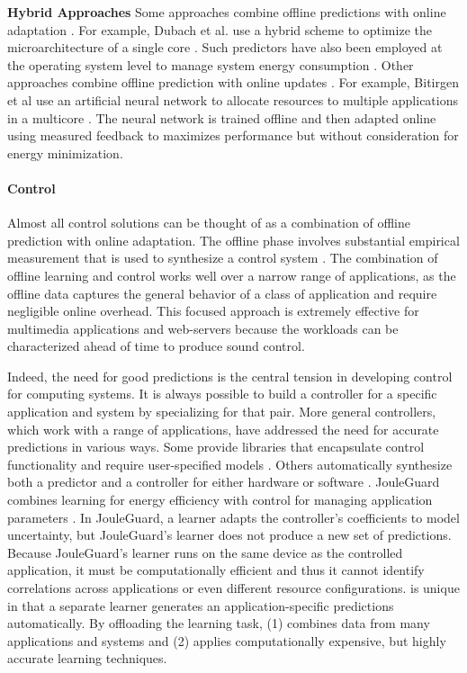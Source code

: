 \noindent \textbf{Hybrid Approaches} Some approaches combine offline
predictions with online adaptation
\cite{Zhang2012,packandcap,Winter2010,dubach2010,Koala,Cinder,
  wu2012inferred}.  For example, Dubach et al.  use a hybrid scheme to
optimize the microarchitecture of a single core \cite{dubach2010}.
Such predictors have also been employed at the operating system level
to manage system energy consumption
\cite{Koala,Cinder,wu2012inferred}.  Other approaches combine offline
prediction with online updates \cite{JouleGuard,Bitirgen2008,Ipek}.
For example, Bitirgen et al use an artificial neural network to
allocate resources to multiple applications in a multicore
\cite{Bitirgen2008}.  The neural network is trained offline and then
adapted online using measured feedback to maximizes performance but
without consideration for energy minimization.

\paragraph{Control}

Almost all control solutions can be thought of as a combination of
offline prediction with online adaptation.  The offline phase involves
substantial empirical measurement that is used to synthesize a control
system
\cite{Wu2004,Chen2011,POET,ControlWare,Agilos,Rajkumar,Sojka,Raghavendra2008}.
The combination of offline learning and control works well over a
narrow range of applications, as the offline data captures the general
behavior of a class of application and require negligible online
overhead.  This focused approach is extremely effective for multimedia
applications \cite{grace2,flinn99,flinn2004,xtune,TCST} and
web-servers \cite{Horvarth,LuEtAl-2006a,SunDaiPan-2008a} because the
workloads can be characterized ahead of time to produce sound control.

Indeed, the need for good predictions is the central tension in
developing control for computing systems.  It is always possible to
build a controller for a specific application and system by
specializing for that pair.  More general controllers, which work with
a range of applications, have addressed the need for accurate
predictions in various ways.  Some provide libraries that encapsulate
control functionality and require user-specified models
\cite{ControlWare,Sojka,Rajkumar,POET,SWiFT}.  Others automatically
synthesize both a predictor and a controller for either hardware
\cite{josep-isca2016} or software \cite{ICSE2014,FSE2015}.  JouleGuard
combines learning for energy efficiency with control for managing
application parameters \cite{JouleGuard}.  In JouleGuard, a learner
adapts the controller's coefficients to model uncertainty, but
JouleGuard's learner does not produce a new set of predictions.
Because JouleGuard's learner runs on the same device as the controlled
application, it must be computationally efficient and thus it cannot
identify correlations across applications or even different resource
configurations.  \SYSTEM{} is unique in that a separate learner
generates an application-specific predictions automatically.  By
offloading the learning task, \SYSTEM{} (1) combines data from many
applications and systems and (2) applies computationally expensive,
but highly accurate learning techniques.



